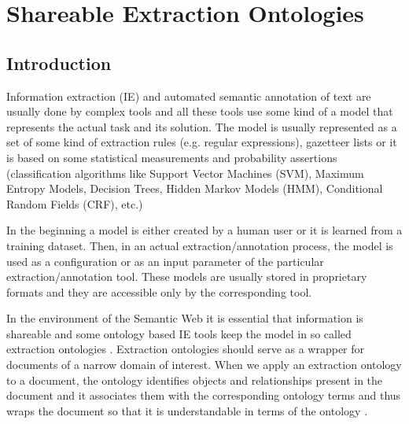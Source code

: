 \chapter{Shareable Extraction Ontologies}

\graphicspath{{../img/ch70/}}



\section{Introduction}


Information extraction (IE) and automated semantic annotation of text are usually done by complex tools and all these tools use some kind of a model that represents the actual task and its solution. The model is usually represented as a set of some kind of extraction rules (e.g. regular expressions), gazetteer lists or it is based on some statistical measurements and probability assertions (classification algorithms like Support Vector Machines (SVM), Maximum Entropy Models, Decision Trees, Hidden Markov Models (HMM), Conditional Random Fields (CRF), etc.)

In the beginning a model is either created by a human user or it is learned from a training dataset. Then, in an actual extraction/annotation process, the model is used as a configuration or as an input parameter of the particular extraction/annotation tool. These models are usually stored in proprietary formats and they are accessible only by the corresponding tool.

In the environment of the Semantic Web it is essential that information is shareable and some ontology based IE tools keep the model in so called extraction ontologies \citep{DBLP:conf/er/EmbleyTL02}. Extraction ontologies should serve as a wrapper for documents of a narrow domain of interest. When we apply an extraction ontology to a document, the ontology identifies objects and relationships present in the document and it associates them with the corresponding ontology terms and thus wraps the document so that it is understandable in terms of the ontology \citep{DBLP:conf/er/EmbleyTL02}.



